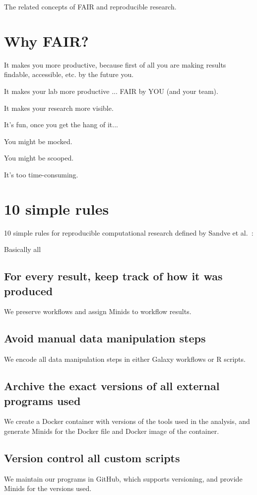 \documentclass[11pt]{article}
\newcommand\ian[1]{}
\newcommand\ian[1]{{\color{red}[Ian: #1]}}
\begin{document}
The related concepts of FAIR and reproducible research.


\section{Why FAIR?}

It makes you more productive, because first of all you are making results findable, accessible, etc. by the future you.

It makes your lab more productive ... FAIR by YOU (and your team).

It makes your research more visible.

It's fun, once you get the hang of it...

\ian{We could include here some counter-arguments to why NOT fair}

You might be mocked.

You might be scooped.

It's too time-consuming.

\section{10 simple rules}

10 simple rules for reproducible computational research defined by Sandve et al.~\cite{sandve2013ten}:

Basically all 

\subsection{For every result, keep track of how it was produced} 
We preserve workflows and assign Minids to workflow results.

\subsection{Avoid manual data manipulation steps} 
We encode all data manipulation steps in either Galaxy workflows or R scripts.

\subsection{Archive the exact versions of all external programs used} 
We create a Docker container with versions of the tools used in the analysis, 
and generate Minids for the Docker file and Docker image of the container.

\subsection{Version control all custom scripts} 
We maintain our programs in GitHub, which supports versioning,
and provide Minids for the versions used.
\end{document}
